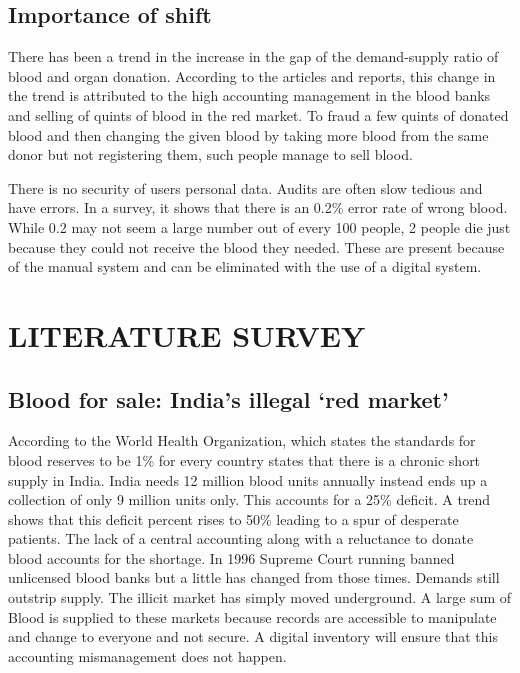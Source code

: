 \documentclass[BTech]{srmuthesis}
\begin{document}
\section{Importance of shift}
There has been a trend in the increase in the gap of the demand-supply ratio of blood and organ donation. According to the articles and reports, this change in the trend is attributed to the high accounting management in the blood banks and selling of quints of blood in the red market. To fraud a few quints of donated blood and then changing the given blood by taking more blood from the same donor but not registering them, such people manage to sell blood.\par 
There is no security of users personal data. Audits are often slow tedious and have errors. In a survey, it shows that there is an 0.2\% error rate of wrong blood. While 0.2 may not seem a large number out of every 100 people, 2 people die just because they could not receive the blood they needed. These are present because of the manual system and can be eliminated with the use of a digital system.

\chapter{LITERATURE SURVEY}
\label{chap:literature}
\section{Blood for sale: India’s illegal ‘red market’}
According to the World Health Organization, which states the standards for blood reserves to be 1\% for every country states that there is a chronic short supply in India. India needs 12 million blood units annually instead ends up a collection of only 9 million units only. This accounts for a 25\% deficit. A trend shows that this deficit percent rises to 50\% leading to a spur of desperate patients. The lack of a central accounting along with a reluctance to donate blood accounts for the shortage. In 1996 Supreme Court running banned unlicensed blood banks but a little has changed from those times. Demands still outstrip supply. The illicit market has simply moved underground. A large sum of Blood is supplied to these markets because records are accessible to manipulate and change to everyone and not secure. A digital inventory will ensure that this accounting mismanagement does not happen. \cite{bbcarticle}
\end{document}
